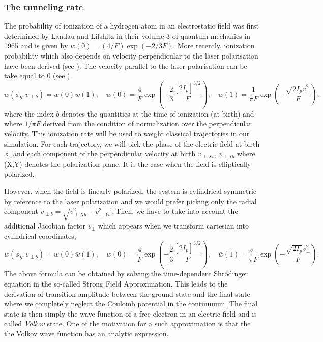 \documentclass[a4paper]{article}
\begin{document}
\subsubsection{The tunneling rate}

The probability of ionization of a hydrogen atom in an electrostatic field was first determined by Landau and Lifshitz in their volume 3 of quantum mechanics in 1965 and is given by $w(0)=(4/F)\exp(-2/3F)$. More recently, ionization probability which also depends on velocity perpendicular to the laser polarisation have been derived (see \cite{Delone_1991}). The velocity parallel to the laser polarisation can be take equal to 0 (see \cite{Hu_1997}).
\begin{equation} 
\label{ADK_distribution}
w(\phi_{b},v_{\perp b})=w(0)w(1), \quad w(0)=\frac{4}{F}\exp(-\frac{2}{3}\frac{[2I_{p}]^{3/2}}{F}), \quad w(1)=\frac{1}{\pi F}\exp(-\frac{\sqrt{2I_{p}}v_{\perp}^{2}}{F}),
\end{equation}
where the index $b$ denotes the quantities at the time of ionization (at birth) and where $1/\pi F$ derived from the condition of normalization over the perpendicular velocity. 
This ionization rate will be used to weight classical trajectories in our simulation. For each trajectory, we will pick the phase of the electric field at birth $\phi_{b}$ and each component of the perpendicular velocity at birth $v_{\perp X b}$, $v_{\perp Y b}$ where (X,Y) denotes the polarization plane. It is the case when the field is elliptically polarized. 
\par
However, when the field is linearly polarized, the system is cylindrical symmetric by reference to the laser polarization and we would prefer picking only the radial component $v_{\perp b}=\sqrt{v_{\perp X b}^{2} + v_{\perp Y b}^{2}}$. Then, we have to take into account the additional Jacobian factor $v_{\perp}$ which appears when we transform cartesian into cylindrical coordinates,
\begin{equation}
w(\phi_{b},v_{\perp b})=w(0)\bar w(1), \quad w(0)=\frac{4}{F}\exp(-\frac{2}{3}\frac{[2I_{p}]^{3/2}}{F}), \quad \bar w(1)=\frac{v_{\perp}}{\pi F}\exp(-\frac{\sqrt{2I_{p}}v_{\perp}^{2}}{F}).
\end{equation}
The above formula can be obtained by solving the time-dependent Shr\"odinger equation in the so-called Strong Field Approximation. This leads to the derivation of transition amplitude between the ground state and the final state where we completely neglect the Coulomb potential in the continuuum. The final state is then simply the wave function of a free electron in an electric field and is called \textit{Volkov} state. One of the motivation for a such approximation is that the the Volkov wave function has an analytic expression.
\end{document}
